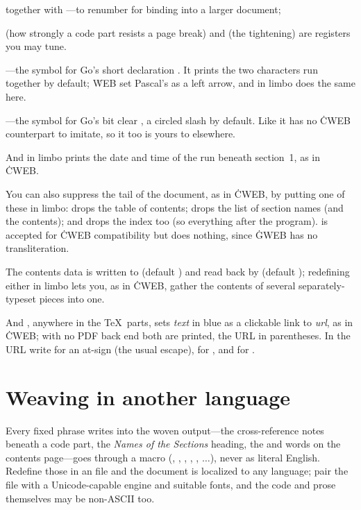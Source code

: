 \bull {} together with
---to renumber for binding into a larger document;

\bull {} (how strongly a code part resists a page break) and
 (the \cw{//} tightening) are registers you may tune.

\bull {}---the symbol for Go's short declaration \cw{:=}. It prints the
two characters run together by default; \.{WEB} set Pascal's \cw{:=} as a left
arrow, and  in limbo does the same here.

\bull {}---the symbol for Go's bit clear \cw{\&\string^}, a circled slash by
default. Like \cw{:=} it has no \.{CWEB} counterpart to imitate, so it too is
yours to  elsewhere.

\noindent And  in limbo prints the date and time of the run
beneath section~1, as in \.{CWEB}.

You can also suppress the tail of the document, as in \.{CWEB}, by putting one of
these in limbo:  drops the table of contents;  drops
the list of section names (and the contents); and  drops the index
too (so everything after the program).  is accepted for \.{CWEB}
compatibility but does nothing, since \.{GWEB} has no  transliteration.

The contents data is written to  (default ) and read back by  (default ); redefining either in limbo lets you, as in \.{CWEB}, gather the
contents of several separately-typeset pieces into one.

And , anywhere in the
\TeX\ parts, sets {\it text\/} in blue as a clickable link to {\it url\/}, as in
\.{CWEB}; with no PDF back end both are printed, the URL in parentheses. In the
URL write  for an at-sign (the usual  escape),  for
, and  for .

\chapter{Weaving in another language}
\noindent Every fixed phrase  writes into the woven output---the
cross-reference notes beneath a code part, the {\it Names of the Sections\/}
heading, the  and  words on the contents page---goes through
a macro (, , , ,
, $\ldots$), never as literal English. Redefine those in an
 file and the document is localized to any language; pair the file
with a Unicode-capable engine and suitable fonts, and the code and prose themselves
may be non-ASCII too.

